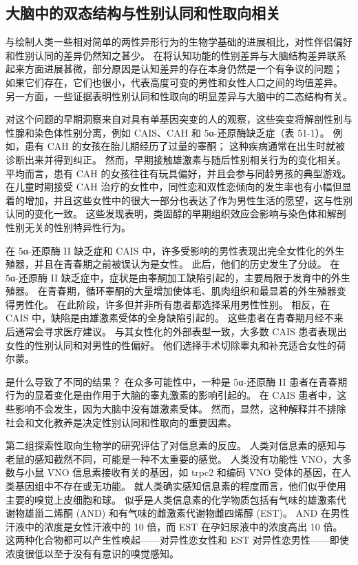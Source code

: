 \subsection{大脑中的双态结构与性别认同和性取向相关}

与绘制人类一些相对简单的两性异形行为的生物学基础的进展相比，对性伴侣偏好和性别认同的差异仍然知之甚少。
在将认知功能的性别差异与大脑结构差异联系起来方面进展甚微，部分原因是认知差异的存在本身仍然是一个有争议的问题；
如果它们存在，它们也很小，代表高度可变的男性和女性人口之间的均值差异。
另一方面，一些证据表明性别认同和性取向的明显差异与大脑中的二态结构有关。


对这个问题的早期洞察来自对具有单基因突变的人的观察，这些突变将解剖性别与性腺和染色体性别分离，例如 CAIS、CAH 和 5α-还原酶缺乏症（表 51-1）。
例如，患有 CAH 的女孩在胎儿期经历了过量的睾酮；
这种疾病通常在出生时就被诊断出来并得到纠正。
然而，早期接触雄激素与随后性别相关行为的变化相关。
平均而言，患有 CAH 的女孩往往有玩具偏好，并且会参与同龄男孩的典型游戏。
在儿童时期接受 CAH 治疗的女性中，同性恋和双性恋倾向的发生率也有小幅但显着的增加，并且这些女性中的很大一部分也表达了作为男性生活的愿望，这与性别认同的变化一致。
这些发现表明，类固醇的早期组织效应会影响与染色体和解剖性别无关的性别特异性行为。


在 5α-还原酶 II 缺乏症和 CAIS 中，许多受影响的男性表现出完全女性化的外生殖器，并且在青春期之前被误认为是女性。
此后，他们的历史发生了分歧。
在 5α-还原酶 II 缺乏症中，症状是由睾酮加工缺陷引起的，主要局限于发育中的外生殖器。
在青春期，循环睾酮的大量增加使体毛、肌肉组织和最显着的外生殖器变得男性化。
在此阶段，许多但并非所有患者都选择采用男性性别。
相反，在 CAIS 中，缺陷是由雄激素受体的全身缺陷引起的。
这些患者在青春期月经不来后通常会寻求医疗建议。
与其女性化的外部表型一致，大多数 CAIS 患者表现出女性的性别认同和对男性的性偏好。
他们选择手术切除睾丸和补充适合女性的荷尔蒙。


是什么导致了不同的结果？
在众多可能性中，一种是 5α-还原酶 II 患者在青春期行为的显着变化是由作用于大脑的睾丸激素的影响引起的。
在 CAIS 患者中，这些影响不会发生，因为大脑中没有雄激素受体。
然而，显然，这种解释并不排除社会和文化教养是决定性别认同和性取向的重要因素。


第二组探索性取向生物学的研究评估了对信息素的反应。
人类对信息素的感知与老鼠的感知截然不同，可能是一种不太重要的感觉。
人类没有功能性 VNO，大多数与小鼠 VNO 信息素接收有关的基因，如 trpc2 和编码 VNO 受体的基因，在人类基因组中不存在或无功能。
就人类确实感知信息素的程度而言，他们似乎使用主要的嗅觉上皮细胞和球。
似乎是人类信息素的化学物质包括有气味的雄激素代谢物雄甾二烯酮 (AND) 和有气味的雌激素代谢物雌四烯醇 (EST)。
AND 在男性汗液中的浓度是女性汗液中的 10 倍，而 EST 在孕妇尿液中的浓度高出 10 倍。
这两种化合物都可以产生性唤起——对异性恋女性和 EST 对异性恋男性——即使浓度很低以至于没有有意识的嗅觉感知。


